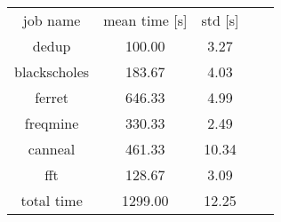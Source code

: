 \begin{table}[h]
\centering
	\begin{tabular}{ |c|c|c|c|c|}
	\hline
	job name & mean time [s] & std [s] \\
	\hhline{ |= |= |= |}
	dedup & 100.00 & 3.27 \\  \hline
	blackscholes & 183.67 & 4.03 \\  \hline
	ferret & 646.33 & 4.99 \\  \hline
	freqmine & 330.33 & 2.49 \\  \hline
	canneal & 461.33 & 10.34 \\  \hline
	fft & 128.67 & 3.09 \\  \hline
	total time & 1299.00 & 12.25 \\  \hline
	\end{tabular}
\end{table}
